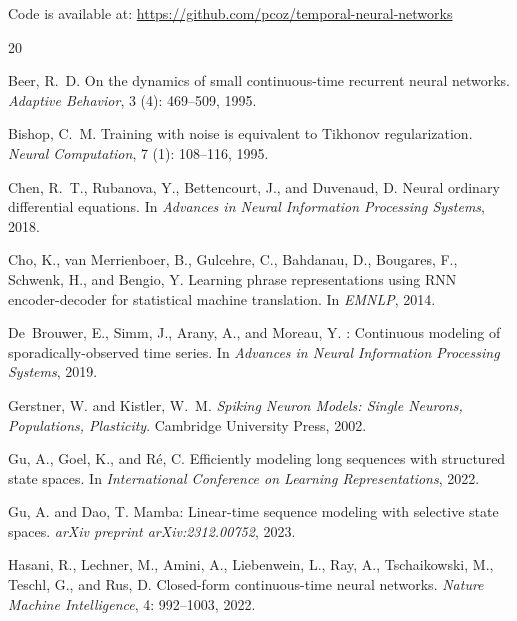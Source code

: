 \documentclass[11pt]{article}
\begin{document}
Code is available at: \url{https://github.com/pcoz/temporal-neural-networks}


\begin{thebibliography}{20}

Beer, R.~D.
\newblock On the dynamics of small continuous-time recurrent neural networks.
\newblock \emph{Adaptive Behavior}, 3 (4): 469--509, 1995.

Bishop, C.~M.
\newblock Training with noise is equivalent to {T}ikhonov regularization.
\newblock \emph{Neural Computation}, 7 (1): 108--116, 1995.

Chen, R.~T., Rubanova, Y., Bettencourt, J., and Duvenaud, D.
\newblock Neural ordinary differential equations.
\newblock In \emph{Advances in Neural Information Processing Systems}, 2018.

Cho, K., van Merrienboer, B., Gulcehre, C., Bahdanau, D., Bougares, F., Schwenk, H., and Bengio, Y.
\newblock Learning phrase representations using {RNN} encoder-decoder for statistical machine translation.
\newblock In \emph{EMNLP}, 2014.

De~Brouwer, E., Simm, J., Arany, A., and Moreau, Y.
: Continuous modeling of sporadically-observed time series.
\newblock In \emph{Advances in Neural Information Processing Systems}, 2019.

Gerstner, W. and Kistler, W.~M.
\newblock \emph{Spiking Neuron Models: Single Neurons, Populations, Plasticity}.
\newblock Cambridge University Press, 2002.

Gu, A., Goel, K., and R{\'e}, C.
\newblock Efficiently modeling long sequences with structured state spaces.
\newblock In \emph{International Conference on Learning Representations}, 2022.

Gu, A. and Dao, T.
\newblock Mamba: Linear-time sequence modeling with selective state spaces.
\newblock \emph{arXiv preprint arXiv:2312.00752}, 2023.

Hasani, R., Lechner, M., Amini, A., Liebenwein, L., Ray, A., Tschaikowski, M., Teschl, G., and Rus, D.
\newblock Closed-form continuous-time neural networks.
\newblock \emph{Nature Machine Intelligence}, 4: 992--1003, 2022.


\end{thebibliography}
\end{document}
